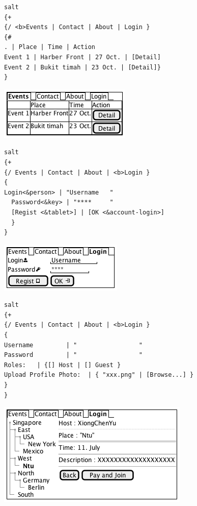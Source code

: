 \documentclass[11pt]{article}
\author{XIONG CHENYU}
\date{\today}
\title{}
\begin{document}
\tableofcontents

\begin{verbatim}
salt
{+
{/ <b>Events | Contact | About | Login }
{#
. | Place | Time | Action
Event 1 | Harber Front | 27 Oct. | [Detail]
Event 2 | Bukit timah | 23 Oct. | [Detail]}
}
\end{verbatim}

\begin{center}
\includegraphics[width=.9\linewidth]{home.png}
\end{center}

\begin{verbatim}
salt
{+
{/ Events | Contact | About | <b>Login }
{
Login<&person> | "Username   "
  Password<&key> | "****     "
  [Regist <&tablet>] | [OK <&account-login>]
  }
}
\end{verbatim}

\begin{center}
\includegraphics[width=.9\linewidth]{login.png}
\end{center}

\begin{verbatim}
salt
{+
{/ Events | Contact | About | <b>Login }
{
Username         | "                 "
Password         | "                 "
Roles:   | {[] Host | [] Guest }
Upload Profile Photo:  | { "xxx.png" | [Browse...] }
}
}
\end{verbatim}

\begin{center}
\includegraphics[width=.9\linewidth]{regist.png}
\end{center}
\end{document}
